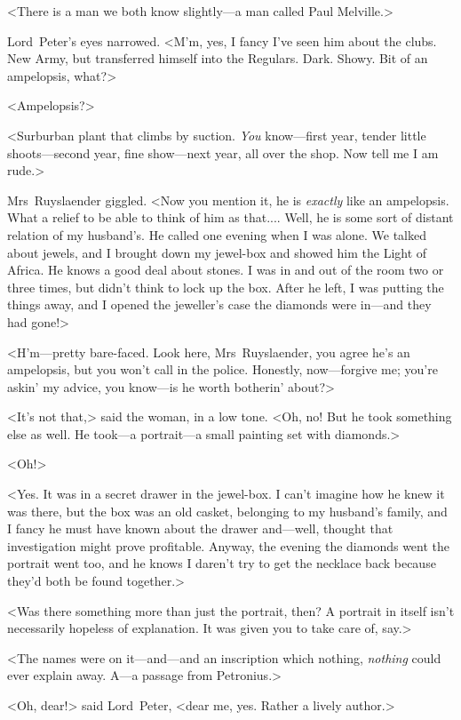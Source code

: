 <There is a man we both know slightly—a man called Paul Melville.>

Lord~Peter's eyes narrowed. <M'm, yes, I fancy I've seen him about the clubs. New Army, but transferred himself into the Regulars. Dark. Showy. Bit of an ampelopsis, what?>

<Ampelopsis?>

<Surburban plant that climbs by suction. \textit{You} know—first year, tender little shoots—second year, fine show—next year, all over the shop. Now tell me I am rude.>

Mrs~Ruyslaender giggled. <Now you mention it, he is \textit{exactly} like an ampelopsis. What a relief to be able to think of him as that.... Well, he is some sort of distant relation of my husband's. He called one evening when I was alone. We talked about jewels, and I brought down my jewel-box and showed him the Light of Africa. He knows a good deal about stones. I was in and out of the room two or three times, but didn't think to lock up the box. After he left, I was putting the things away, and I opened the jeweller's case the diamonds were in—and they had gone!>

<H'm—pretty bare-faced. Look here, Mrs~Ruyslaender, you agree he's an ampelopsis, but you won't call in the police. Honestly, now—forgive me; you're askin' my advice, you know—is he worth botherin' about?>

<It's not that,> said the woman, in a low tone. <Oh, no! But he took something else as well. He took—a portrait—a small painting set with diamonds.>

<Oh!>

<Yes. It was in a secret drawer in the jewel-box. I can't imagine how he knew it was there, but the box was an old casket, belonging to my husband's family, and I fancy he must have known about the drawer and—well, thought that investigation might prove profitable. Anyway, the evening the diamonds went the portrait went too, and he knows I daren't try to get the necklace back because they'd both be found together.>

<Was there something more than just the portrait, then? A portrait in itself isn't necessarily hopeless of explanation. It was given you to take care of, say.>

<The names were on it—and—and an inscription which nothing, \textit{nothing} could ever explain away. A—a passage from Petronius.>

<Oh, dear!> said Lord~Peter, <dear me, yes. Rather a lively author.>

